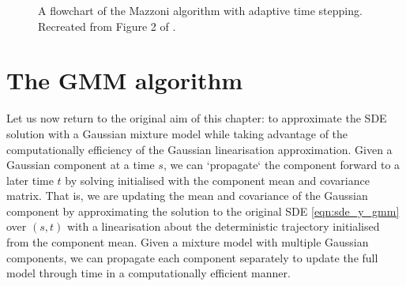 \begin{figure}
\begin{center}
		\caption{A flowchart of the Mazzoni algorithm with adaptive time stepping.
			Recreated from Figure 2 of \citet{Mazzoni_2008_ComputationalAspectsContinuous}.}
		\label{fig:mazzoni_alg}
	\end{center}
\end{figure}





\section{The GMM algorithm}\label{sec:gmm_alg}
Let us now return to the original aim of this chapter: to approximate the SDE solution with a Gaussian mixture model while taking advantage of the computationally efficiency of the Gaussian linearisation approximation.
Given a Gaussian component at a time \(s\), we can `propagate` the component forward to a later time \(t\) by solving  initialised with the component mean and covariance matrix.
That is, we are updating the mean and covariance of the Gaussian component by approximating the solution to the original SDE \cref{eqn:sde_y_gmm} over \((s,t)\) with a linearisation about the deterministic trajectory initialised from the component mean.
Given a mixture model with multiple Gaussian components, we can propagate each component separately to update the full model through time in a computationally efficient manner.

